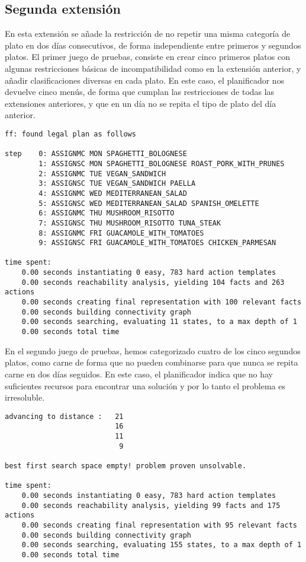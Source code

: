 \documentclass{article}
\begin{document}
\subsection{Segunda extensión}
En esta extensión se añade la restricción de no repetir una misma categoría de plato en dos días consecutivos, de forma independiente entre primeros y segundos platos. El primer juego de pruebas, consiste en crear cinco primeros platos con algunas restricciones básicas de incompatibilidad como en la extensión anterior, y añadir clasificaciones diversas en cada plato. En este caso, el planificador nos devuelve cinco menús, de forma que cumplan las restricciones de todas las extensiones anteriores, y que en un día no se repita el tipo de plato del día anterior.
\begin{lstlisting}[language=none]
ff: found legal plan as follows

step    0: ASSIGNMC MON SPAGHETTI_BOLOGNESE
        1: ASSIGNSC MON SPAGHETTI_BOLOGNESE ROAST_PORK_WITH_PRUNES
        2: ASSIGNMC TUE VEGAN_SANDWICH
        3: ASSIGNSC TUE VEGAN_SANDWICH PAELLA
        4: ASSIGNMC WED MEDITERRANEAN_SALAD
        5: ASSIGNSC WED MEDITERRANEAN_SALAD SPANISH_OMELETTE
        6: ASSIGNMC THU MUSHROOM_RISOTTO
        7: ASSIGNSC THU MUSHROOM_RISOTTO TUNA_STEAK
        8: ASSIGNMC FRI GUACAMOLE_WITH_TOMATOES
        9: ASSIGNSC FRI GUACAMOLE_WITH_TOMATOES CHICKEN_PARMESAN

time spent:
    0.00 seconds instantiating 0 easy, 783 hard action templates
    0.00 seconds reachability analysis, yielding 104 facts and 263 actions
    0.00 seconds creating final representation with 100 relevant facts
    0.00 seconds building connectivity graph
    0.00 seconds searching, evaluating 11 states, to a max depth of 1
    0.00 seconds total time
\end{lstlisting}
En el segundo juego de pruebas, hemos categorizado cuatro de los cinco segundos platos, como carne de forma que no pueden combinarse para que nunca se repita carne en dos días seguidos. En este caso, el planificador indica que no hay suficientes recursos para encontrar una solución y por lo tanto el problema es irresoluble.
\begin{lstlisting}[language=none]
advancing to distance :   21
                          16
                          11
                           9

best first search space empty! problem proven unsolvable.

time spent:
    0.00 seconds instantiating 0 easy, 783 hard action templates
    0.00 seconds reachability analysis, yielding 99 facts and 175 actions
    0.00 seconds creating final representation with 95 relevant facts
    0.00 seconds building connectivity graph
    0.00 seconds searching, evaluating 155 states, to a max depth of 1
    0.00 seconds total time
\end{lstlisting}
\end{document}
